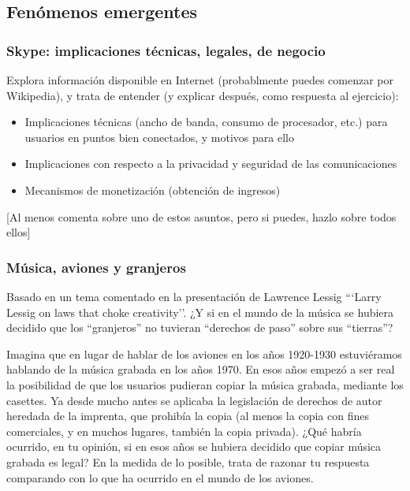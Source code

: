 \documentclass[a4paper,12pt]{article}
\begin{document}
\subsection{Fenómenos emergentes}

\subsubsection{Skype: implicaciones técnicas, legales, de negocio}
\label{sub:skype-implicaciones}

Explora información disponible en Internet (probablmente puedes comenzar por Wikipedia), y trata de entender (y explicar después, como respuesta al ejercicio):

\begin{itemize}
\item Implicaciones técnicas (ancho de banda, consumo de procesador, etc.) para usuarios en puntos bien conectados, y motivos para ello
\item Implicaciones con respecto a la privacidad y seguridad de las comunicaciones
\item Mecanismos de monetización (obtención de ingresos)
\end{itemize}

[Al menos comenta sobre uno de estos asuntos, pero si puedes, hazlo sobre todos ellos]


\subsubsection{Música, aviones y granjeros}
\label{sub:musica-aviones}

Basado en un tema comentado en la presentación de Lawrence Lessig ```Larry Lessig on laws that choke creativity''. ¿Y si en el mundo de la música se hubiera decidido que los ``granjeros'' no tuvieran ``derechos de paso'' sobre sus ``tierras''?

Imagina que en lugar de hablar de los aviones en los años 1920-1930 estuviéramos hablando de la música grabada en los años 1970. En esos años empezó a ser real la posibilidad de que los usuarios pudieran copiar la música grabada, mediante los casettes. Ya desde mucho antes se aplicaba la legislación de derechos de autor heredada de la imprenta, que prohibía la copia (al menos la copia con fines comerciales, y en muchos lugares, también la copia privada). ¿Qué habría ocurrido, en tu opinión, si en esos años se hubiera decidido que copiar música grabada es legal? En la medida de lo posible, trata de razonar tu respuesta comparando con lo que ha ocurrido en el mundo de los aviones.
\end{document}

